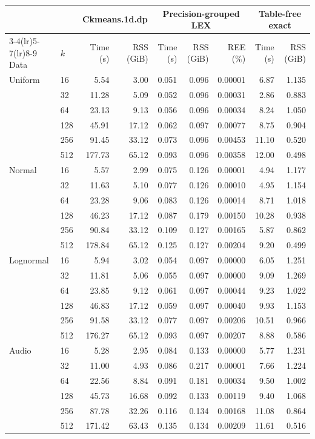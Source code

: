 \setlength{\tabcolsep}{5.5pt}
\begin{tabular}{@{}ll rr rrr rr@{}}
\toprule
 &  & \multicolumn{2}{c}{Ckmeans.1d.dp} & \multicolumn{3}{c}{Precision-grouped LEX} & \multicolumn{2}{c}{Table-free exact} \\
\cmidrule(lr){3-4}\cmidrule(lr){5-7}\cmidrule(lr){8-9}
Data & $k$ & Time (s) & RSS (GiB) & Time (s) & RSS (GiB) & REE (\%) & Time (s) & RSS (GiB) \\
\midrule
Uniform & 16 & 5.54 & 3.00 & 0.051 & 0.096 & 0.00001 & 6.87 & 1.135 \\
 & 32 & 11.28 & 5.09 & 0.052 & 0.096 & 0.00031 & 2.86 & 0.883 \\
 & 64 & 23.13 & 9.13 & 0.056 & 0.096 & 0.00034 & 8.24 & 1.050 \\
 & 128 & 45.91 & 17.12 & 0.062 & 0.097 & 0.00077 & 8.75 & 0.904 \\
 & 256 & 91.45 & 33.12 & 0.073 & 0.096 & 0.00453 & 11.10 & 0.520 \\
 & 512 & 177.73 & 65.12 & 0.093 & 0.096 & 0.00358 & 12.00 & 0.498 \\
\addlinespace
Normal & 16 & 5.57 & 2.99 & 0.075 & 0.126 & 0.00001 & 4.94 & 1.177 \\
 & 32 & 11.63 & 5.10 & 0.077 & 0.126 & 0.00010 & 4.95 & 1.154 \\
 & 64 & 23.28 & 9.06 & 0.083 & 0.126 & 0.00014 & 8.71 & 1.018 \\
 & 128 & 46.23 & 17.12 & 0.087 & 0.179 & 0.00150 & 10.28 & 0.938 \\
 & 256 & 90.84 & 33.12 & 0.109 & 0.127 & 0.00165 & 5.87 & 0.862 \\
 & 512 & 178.84 & 65.12 & 0.125 & 0.127 & 0.00204 & 9.20 & 0.499 \\
\addlinespace
Lognormal & 16 & 5.94 & 3.02 & 0.054 & 0.097 & 0.00000 & 6.05 & 1.251 \\
 & 32 & 11.81 & 5.06 & 0.055 & 0.097 & 0.00000 & 9.09 & 1.269 \\
 & 64 & 23.85 & 9.12 & 0.061 & 0.097 & 0.00044 & 9.23 & 1.022 \\
 & 128 & 46.83 & 17.12 & 0.059 & 0.097 & 0.00040 & 9.93 & 1.153 \\
 & 256 & 91.58 & 33.12 & 0.077 & 0.097 & 0.00206 & 10.51 & 0.966 \\
 & 512 & 176.27 & 65.12 & 0.093 & 0.097 & 0.00207 & 8.88 & 0.586 \\
\addlinespace
Audio & 16 & 5.28 & 2.95 & 0.084 & 0.133 & 0.00000 & 5.77 & 1.231 \\
 & 32 & 11.00 & 4.93 & 0.086 & 0.217 & 0.00001 & 7.66 & 1.224 \\
 & 64 & 22.56 & 8.84 & 0.091 & 0.181 & 0.00034 & 9.50 & 1.002 \\
 & 128 & 45.73 & 16.68 & 0.092 & 0.133 & 0.00119 & 9.40 & 1.068 \\
 & 256 & 87.78 & 32.26 & 0.116 & 0.134 & 0.00168 & 11.08 & 0.864 \\
 & 512 & 171.42 & 63.43 & 0.135 & 0.134 & 0.00209 & 11.61 & 0.516 \\
\bottomrule
\end{tabular}
